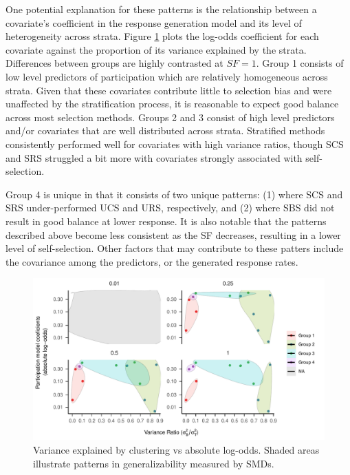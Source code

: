 \documentclass[
  man,floatsintext]{apa6}
\begin{document}
One potential explanation for these patterns is the relationship between a covariate's coefficient in the response generation model and its level of heterogeneity across strata.
Figure \ref{fig:fig-Var-Coef} plots the log-odds coefficient for each covariate against the proportion of its variance explained by the strata.
Differences between groups are highly contrasted at \(SF = 1\). Group 1 consists of low level predictors of participation which are relatively homogeneous across strata. Given that these covariates contribute little to selection bias and were unaffected by the stratification process, it is reasonable to expect good balance across most selection methods.
Groups 2 and 3 consist of high level predictors and/or covariates that are well distributed across strata. Stratified methods consistently performed well for covariates with high variance ratios, though SCS and SRS struggled a bit more with covariates strongly associated with self-selection.

Group 4 is unique in that it consists of two unique patterns: (1) where SCS and SRS under-performed UCS and URS, respectively, and (2) where SBS did not result in good balance at lower response. It is also notable that the patterns described above become less consistent as the SF decreases, resulting in a lower level of self-selection. Other factors that may contribute to these patters include the covariance among the predictors, or the generated response rates.



\begin{figure}
\centering
\includegraphics{6---Paper_files/figure-latex/fig-Var-Coef-1.pdf}
\caption{\label{fig:fig-Var-Coef}Variance explained by clustering vs absolute log-odds. Shaded areas illustrate patterns in generalizability measured by SMDs.}
\end{figure}
\end{document}
